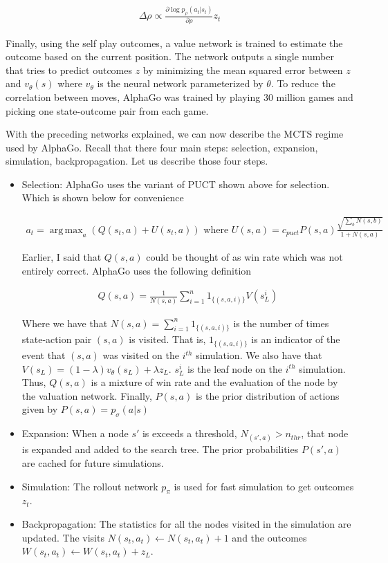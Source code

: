 \documentclass{article}
\DeclareMathOperator*{\argmax}{arg\,max}
\begin{document}
  \begin{gather*}
    \Delta \rho \propto \frac{\partial \log p_\rho (a_t | s_t)}{\partial \rho} z_t
  \end{gather*}

  Finally, using the self play outcomes, a value network is trained to estimate the outcome based on the current position. The network outputs a single number that tries to predict outcomes $z$ by minimizing the mean squared error between $z$ and $v_{\theta}(s)$ where $v_{\theta}$ is the neural network parameterized by $\theta$. To reduce the correlation between moves, AlphaGo was trained by playing 30 million games and picking one state-outcome pair from each game.

  With the preceding networks explained, we can now describe the MCTS regime used by AlphaGo. Recall that there four main steps: selection, expansion, simulation, backpropagation. Let us describe those four steps.

  \begin{itemize}
    \item Selection: AlphaGo uses the variant of PUCT shown above for selection. Which is shown below for convenience

    \begin{gather*}
      a_t = \argmax_{a} (Q(s_t,a) + U(s_t,a)) \text{ where } U(s,a) = c_{puct} P(s,a) \frac{\sqrt{\sum_b N(s,b)}}{1 + N(s,a)}
    \end{gather*}

    Earlier, I said that $Q(s,a)$ could be thought of as win rate which was not entirely correct. AlphaGo uses the following definition

    \begin{gather*}
      Q(s,a) = \frac{1}{N(s,a)} \sum_{i=1}^n 1_{\{(s,a,i)\}} V(s_L^i)
    \end{gather*}

    Where we have that $N(s,a) = \sum_{i=1}^n 1_{\{(s,a,i)\}}$ is the number of times state-action pair $(s,a)$ is visited. That is, $1_{\{(s,a,i)\}}$ is an indicator of the event that $(s,a)$ was visited on the $i^{th}$ simulation. We also have that $V(s_L) = (1-\lambda) v_{\theta}(s_L) + \lambda z_L$. $s_L^i$ is the leaf node on the $i^{th}$ simulation. Thus, $Q(s,a)$ is a mixture of win rate and the evaluation of the node by the valuation network. Finally, $P(s,a)$ is the prior distribution of actions given by $P(s,a) = p_{\sigma} (a | s)$

    \item Expansion: When a node $s'$ is exceeds a threshold, $N_(s',a) > n_{thr}$, that node is expanded and added to the search tree. The prior probabilities $P(s',a)$ are cached for future simulations.

    \item Simulation: The rollout network $p_{\pi}$ is used for fast simulation to get outcomes $z_t$.

    \item Backpropagation: The statistics for all the nodes visited in the simulation are updated. The visits $N(s_t,a_t) \leftarrow N(s_t,a_t) +1$ and the outcomes $W(s_t,a_t) \leftarrow W(s_t, a_t) + z_L$.

  \end{itemize}
\end{document}
